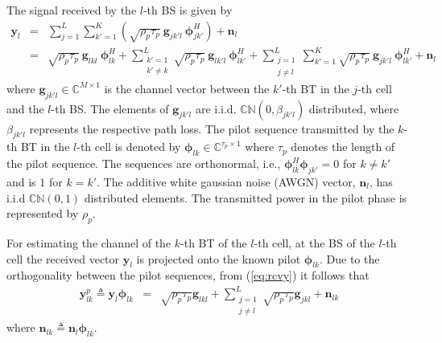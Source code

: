 \documentclass[10pt, a4paper, twoside,fleqn]{article}
\begin{document}
The signal received by the $l$-th BS is given by
\begin{eqnarray}\label{eq:rcvy}
	\pmb{y}_{l} &=& \sum_{j=1}^{L} \sum_{k'=1}^{K} \left(\sqrt{\rho_p \tau_p} \ \pmb{g}_{jk'l} \ \pmb{\phi}^H_{jk'}\right)
        		    +  \pmb{n}_{l} \nonumber \\                    
    			   &=& \sqrt{\rho_p \tau_p} \ \pmb{g}_{lkl} \ \pmb{\phi}^H_{lk}
        			+  \sum_{\substack{k'=1 \\ k' \neq k}}^{L} \sqrt{\rho_p \tau_p} \ \pmb{g}_{lk'l} \ \pmb{\phi}^H_{lk'}
        		    +  \sum_{\substack{j=1 \\ j \neq l}}^{L} \sum_{k'=1}^{K} \sqrt{\rho_p \tau_p} \
                       \pmb{g}_{jk'l} \ \pmb{\phi}^H_{lk'}
    			    +  \pmb{n}_{l}
\end{eqnarray}
where $\pmb{g}_{jk'l} \in {\mathbb C}^{M \times 1}$ is the channel vector between the $k'$-th BT in the $j$-th cell and the $l$-th BS. The elements of $\pmb{g}_{jk'l}$ are i.i.d. ${\mathbb C}{\mathbb N}(0, \beta_{jk'l})$ distributed, where $\beta_{jk'l}$ represents the respective path loss. The pilot sequence transmitted by the $k$-th BT in the $l$-th cell is denoted by $\pmb{\phi}_{lk} \in {\mathbb C}^{\tau_p \times 1}$ where $\tau_p$ denotes the length of the pilot sequence. The sequences are orthonormal, i.e., $\pmb{\phi}_{lk}^H \pmb{\phi}_{jk'} = 0$ for  $k \ne k'$ and is $1$ for $k=k'$. The additive white gaussian noise (AWGN) vector, $\pmb{n}_l$, has i.i.d ${\mathbb C}{\mathbb N}(0,1)$ distributed elements. The transmitted power in the pilot phase is represented by $\rho_p$.

For estimating the channel of the $k$-th BT of the $l$-th cell, at the BS of the $l$-th cell the received vector $\pmb{y}_{l}$ is projected onto the known pilot $\pmb{\phi}_{lk}$. Due to the orthogonality between the pilot sequences, from (\ref{eq:rcvy}) it follows that
\begin{eqnarray}\label{eqn:ylkp}
	\pmb{y}_{lk}^{p} \triangleq \pmb{y}_{l} \pmb{\phi}_{lk}
                          &=&     \sqrt{\rho_p\tau_p}\pmb{g}_{lkl}
                           +      \sum_{\substack{j=1 \\ j \neq l}}^{L} \sqrt{\rho_p\tau_p}\pmb{g}_{jkl}
             			   +      \pmb{n}_{lk}
\end{eqnarray}
where $\pmb{n}_{lk} \triangleq \pmb{n}_{l}\pmb{\phi}_{lk}$.
\end{document}
